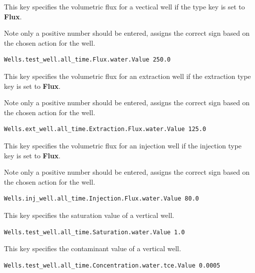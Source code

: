 {
This key specifies the volumetric flux for a vectical well if the type
key is set to {\bf Flux}.

Note only a positive number should be entered, \parflow{} assigns the
correct sign based on the chosen action for the well.
}
\begin{display}\begin{verbatim}
Wells.test_well.all_time.Flux.water.Value 250.0
\end{verbatim}\end{display}

{
This key specifies the volumetric flux for an extraction well if the
extraction type key is set to {\bf Flux}.

Note only a positive number should be entered, \parflow{} assigns the
correct sign based on the chosen action for the well.
}
\begin{display}\begin{verbatim}
Wells.ext_well.all_time.Extraction.Flux.water.Value 125.0
\end{verbatim}\end{display}

{
This key specifies the volumetric flux for an injection well if the
injection type key is set to {\bf Flux}.

Note only a positive number should be entered, \parflow{} assigns the
correct sign based on the chosen action for the well.
}
\begin{display}\begin{verbatim}
Wells.inj_well.all_time.Injection.Flux.water.Value 80.0
\end{verbatim}\end{display}

{
This key specifies the saturation value of a vertical well.
}
\begin{display}\begin{verbatim}
Wells.test_well.all_time.Saturation.water.Value 1.0
\end{verbatim}\end{display}

{
This key specifies the contaminant value of a vertical well.
}
\begin{display}\begin{verbatim}
Wells.test_well.all_time.Concentration.water.tce.Value 0.0005
\end{verbatim}\end{display}

